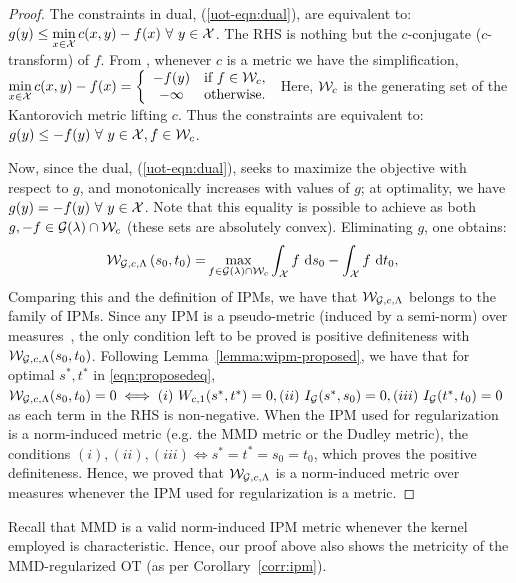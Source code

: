 \begin{proof}
The constraints in dual, (\ref{uot-eqn:dual}), are equivalent to: $g(y)\le\min\limits_{x\in\calX}c(x,y)-f(x)\ \forall\ y\in\calX$. The RHS is nothing but the $c$-conjugate ($c$-transform) of $f$. From \citet[Proposition~(6.1)]{peyre2019computational}, whenever $c$ is a metric we have the simplification, $\min\limits_{x\in\mathcal{X}}c(x,y)-f(x)=\left\{\begin{array}{cc}
    -f(y) & \textup{if } f\in\mathcal{W}_c,\\
    -\infty & \textup{otherwise}.
\end{array}\right.$ Here, $\mathcal{W}_c$ is the generating set of the Kantorovich metric lifting $c$. Thus the constraints are equivalent to: $g(y)\le-f(y)\ \forall\ y\in\mathcal{X}, f\in\mathcal{W}_c$.
 
Now, since the dual, (\ref{uot-eqn:dual}), seeks to maximize the objective with respect to $g$, and monotonically increases with values of $g$; at optimality, we have $g(y)=-f(y)\ \forall\ y\in\calX$. Note that this equality is possible to achieve as both $g,-f\in\mathcal{G}(\lambda)\cap\mathcal{W}_c$ (these sets are absolutely convex). Eliminating $g$, one obtains:
\begin{align}\label{app:eqn-dual1}
    \mathcal{W}_{\mathcal{G}, c, \Lambda}\left(s_0,t_0\right)=&\max\limits_{f\in\mathcal{G}(\lambda)\cap\mathcal{W}_c}\int_{\mathcal{X}} f\ \textup{d}s_0-\int_{\mathcal{X}} f\ \textup{d}t_0,
\end{align}
    Comparing this and the definition of IPMs, we have that $\mathcal{W}_{\mathcal{G}, c, \Lambda}$ belongs to the family of IPMs. Since any IPM is a pseudo-metric (induced by a semi-norm) over measures~\citep{mullergenset97}, the only condition left to be proved is positive definiteness with $\mathcal{W}_{\mathcal{G}, c, \Lambda}(s_0, t_0)$. Following Lemma~\ref{lemma:wipm-proposed}, we have that for optimal $s^*,t^*$ in \ref{eqn:proposedeq}, 
    $\mathcal{W}_{\mathcal{G}, c, \Lambda}(s_0, t_0)=0\iff (i)\ W_{c, 1}(s^*, t^*)=0, (ii)\  I_{\mathcal{G}}(s^*, s_0)=0, (iii)\  I_{\mathcal{G}}(t^*, t_0)=0$ as each term in the RHS is non-negative. When the IPM used for regularization is a norm-induced metric (e.g. the MMD metric or the Dudley metric), the conditions $(i), (ii), (iii)\iff s^*=t^*=s_0=t_0$, which proves the positive definiteness. Hence, we proved that $\mathcal{W}_{\mathcal{G}, c, \Lambda}$ is a norm-induced metric over measures whenever the IPM used for regularization is a metric.
\end{proof}
\begin{remark}
    Recall that MMD is a valid norm-induced IPM metric whenever the kernel employed is characteristic. Hence, our proof above also shows the metricity of the MMD-regularized OT (as per Corollary~\ref{corr:ipm}).
\end{remark}
